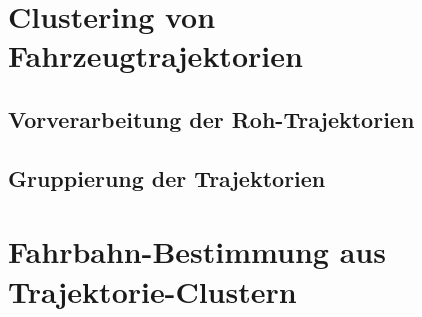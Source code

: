 

\chapter{Clustering von Fahrzeugtrajektorien}
\label{cha:realisation_clustering}


\section{Vorverarbeitung der Roh-Trajektorien}
\label{sec:realisation_preprocessing}


\section{Gruppierung der Trajektorien}
\label{sec:realisation_clustering}



\chapter{Fahrbahn-Bestimmung aus Trajektorie-Clustern}
\label{cha:lane_definition}

